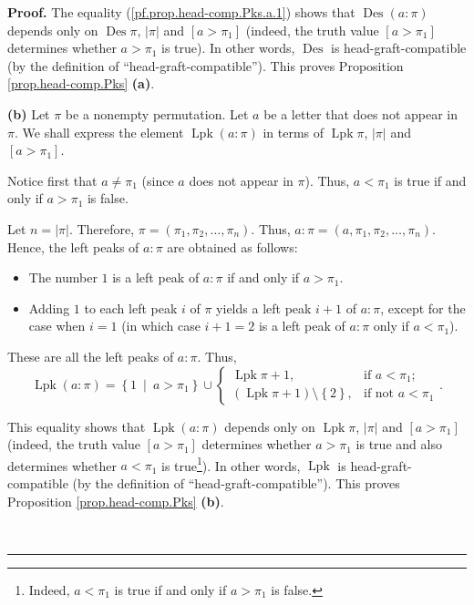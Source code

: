 \documentclass[numbers=enddot,12pt,final,onecolumn,notitlepage]{scrartcl}%
\theoremstyle{definition}
\newenvironment{proof}[1][Proof]{\noindent\textbf{#1.} }{\ \rule{0.5em}{0.5em}}
\begin{document}
\begin{proof}
The equality (\ref{pf.prop.head-comp.Pks.a.1}) shows that $\operatorname*{Des}%
\left(  a:\pi\right)  $ depends only on $\operatorname*{Des}\pi$, $\left\vert
\pi\right\vert $ and $\left[  a>\pi_{1}\right]  $ (indeed, the truth value
$\left[  a>\pi_{1}\right]  $ determines whether $a>\pi_{1}$ is true). In other
words, $\operatorname*{Des}$ is head-graft-compatible (by the definition of
\textquotedblleft head-graft-compatible\textquotedblright). This proves
Proposition \ref{prop.head-comp.Pks} \textbf{(a)}.

\textbf{(b)} Let $\pi$ be a nonempty permutation. Let $a$ be a letter that
does not appear in $\pi$. We shall express
the element $\operatorname*{Lpk}\left(  a:\pi\right)  $ in terms of
$\operatorname*{Lpk}\pi$, $\left|\pi\right|$
and $\left[  a>\pi_{1}\right]  $.

Notice first that $a\neq\pi_{1}$ (since $a$ does not appear in $\pi$). Thus,
$a<\pi_{1}$ is true if and only if $a>\pi_{1}$ is false.

Let $n=\left\vert \pi\right\vert $. Therefore, $\pi=\left(  \pi_{1},\pi
_{2},\ldots,\pi_{n}\right)  $. Thus, $a:\pi=\left(  a,\pi_{1},\pi_{2}%
,\ldots,\pi_{n}\right)  $. Hence, the left peaks of $a:\pi$ are obtained as follows:

\begin{itemize}
\item The number $1$ is a left peak of $a:\pi$ if and only if $a>\pi_{1}$.

\item Adding $1$ to each left peak $i$ of $\pi$ yields a left peak $i+1$ of
$a:\pi$, except for the case when $i=1$ (in which case $i+1=2$ is a left peak
of $a:\pi$ only if $a<\pi_{1}$).
\end{itemize}

These are all the left peaks of $a:\pi$. Thus,%
\begin{equation}
\operatorname*{Lpk}\left(  a:\pi\right)  =\left\{  1\ \mid\ a>\pi_{1}\right\}
\cup%
\begin{cases}
\operatorname*{Lpk}\pi+1, & \text{if }a<\pi_{1};\\
\left(  \operatorname*{Lpk}\pi+1\right)  \setminus\left\{  2\right\}  , &
\text{if not }a<\pi_{1}%
\end{cases}
. \label{pf.prop.head-comp.Pks.b.1}%
\end{equation}


This equality shows that $\operatorname*{Lpk}\left(  a:\pi\right)  $ depends
only on $\operatorname*{Lpk}\pi$, $\left\vert \pi\right\vert $ and $\left[
a>\pi_{1}\right]  $ (indeed, the truth value $\left[  a>\pi_{1}\right]  $
determines whether $a>\pi_{1}$ is true and also determines whether $a<\pi_{1}$
is true\footnote{Indeed, $a<\pi_{1}$ is true if and only if $a>\pi_{1}$ is
false.}). In other words, $\operatorname*{Lpk}$ is head-graft-compatible (by
the definition of \textquotedblleft head-graft-compatible\textquotedblright).
This proves Proposition \ref{prop.head-comp.Pks} \textbf{(b)}.


\end{proof}
\end{document}
